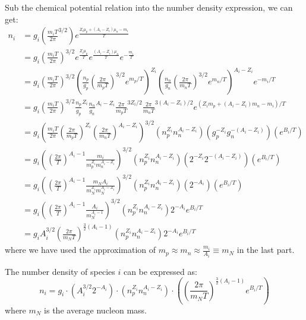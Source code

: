 \begin{foundation}
    \pagebreak
    Sub the chemical potential relation into the number density expression, we can get:
    \begin{align*}
        n_i &= g_i \left( \frac{m_i T}{2 \pi}^{3/2} \right)e^{\frac{Z_i \mu_p + (A_i - Z_i) \mu_n - m_i}{T}}  \\
            &= g_i \left( \frac{m_i T}{2 \pi} \right)^{3/2} e^{\frac{Z_i \mu_p}{T}} e^{\frac{(A_i - Z_i) \mu_n}{T}} e^{-\frac{m_i}{T}} \\ 
            &= g_i \left( \frac{m_i T}{2 \pi} \right)^{3/2} \left( \frac{n_p}{g_p} (\frac{2\pi}{m_p T})^{3/2} e^{m_p / T} \right)^{Z_i} \left( \frac{n_n}{g_n} (\frac{2\pi}{m_n T})^{3/2} e^{m_n / T} \right)^{A_i - Z_i} e^{-m_i / T} \\
            &= g_i \left( \frac{m_i T}{2 \pi} \right)^{3/2} \frac{n_p}{g_p}^{Z_i} \frac{n_n}{g_n}^{A_i - Z_i} \frac{2\pi}{m_p T}^{3Z_i / 2} \frac{2\pi}{m_n T}^{3(A_i - Z_i) / 2} e^{(Z_i m_p + (A_i - Z_i) m_n - m_i) / T} \\
            &= g_i \left( \frac{m_i T}{2 \pi} (\frac{2\pi}{m_p T})^{Z_i} (\frac{2\pi}{m_n T})^{A_i - Z_i} \right)^{3/2} \left(n_p^{Z_i} n_n^{A_i - Z_i}\right) \left( g_p^{-Z_i} g_n^{-(A_i - Z_i)} \right) \left( e^{B_i / T} \right) \\
            &= g_i \left( (\frac{2\pi}{T})^{A_i - 1} \frac{m_i}{m_p^{Z_i} m_n^{A_i - Z_i}} \right)^{3/2} \left(n_p^{Z_i} n_n^{A_i - Z_i}\right) \left( 2^{-Z_i} 2^{-(A_i - Z_i)} \right) \left( e^{B_i / T} \right) \\
            &= g_i \left( (\frac{2\pi}{T})^{A_i - 1} \frac{m_N A_i}{m_N^{Z_i} m_N^{A_i - Z_i}} \right)^{3/2} \left(n_p^{Z_i} n_n^{A_i - Z_i}\right) \left( 2^{-A_i} \right) \left( e^{B_i / T} \right) \\
            &= g_i \left( (\frac{2\pi}{T})^{A_i - 1} \frac{A_i}{m_N^{A_i - 1}} \right)^{3/2} \left(n_p^{Z_i} n_n^{A_i - Z_i}\right) 2^{-A_i} e^{B_i / T} \\
            &= g_i A_i^{3/2} \left( \frac{2\pi}{m_N T} \right)^{\frac{3}{2}(A_i - 1)} \left(n_p^{Z_i} n_n^{A_i - Z_i}\right) 2^{-A_i} e^{B_i / T}
    \end{align*}
    where we have used the approximation of $m_p \approx m_n \approx \frac{m_i}{A_i} \equiv m_N$ in the last part. \\
\end{foundation}

\bigskip \noindent
\begin{theory}
    The number density of species $i$ can be expressed as:
    \[
        n_i = g_i \cdot \left(A_i^{3/2} 2^{-A_i}\right) \cdot  \left(n_p^{Z_i} n_n^{A_i - Z_i}\right) \cdot \left( (\frac{2\pi}{m_N T})^{\frac{3}{2}(A_i - 1)} e^{B_i / T} \right)
    \]
    where $m_N$ is the average nucleon mass.
\end{theory}


